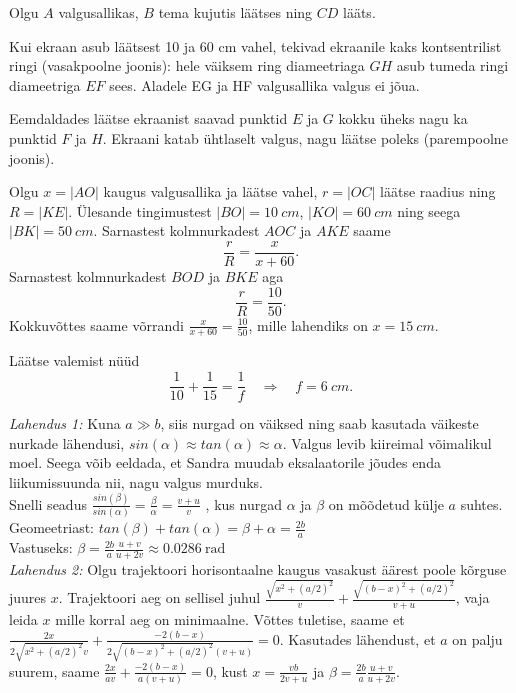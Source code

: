\documentclass[10pt]{article}
\begin{document}
Olgu $A$ valgusallikas, $B$ tema kujutis läätses ning $CD$ lääts.

Kui ekraan asub läätsest 10 ja 60 cm vahel, tekivad ekraanile kaks kontsentrilist ringi (vasakpoolne joonis): hele väiksem ring diameetriaga $GH$ asub tumeda ringi diameetriga $EF$ sees. Aladele EG ja HF valgusallika valgus ei jõua.

Eemdaldades läätse ekraanist saavad punktid $E$ ja $G$ kokku üheks nagu ka punktid $F$ ja $H$. Ekraani katab ühtlaselt valgus, nagu läätse poleks (parempoolne joonis).

Olgu $x=|AO|$ kaugus valgusallika ja läätse vahel, $r=|OC|$ läätse raadius ning $R=|KE|$. Ülesande tingimustest $|BO|=\SI{10}{cm}$, $|KO|=\SI{60}{cm}$ ning seega $|BK|=\SI{50}{cm}$. Sarnastest kolmnurkadest $AOC$ ja $AKE$ saame
\[
  \frac{r}{R}=\frac{x}{x+60}.
\]
Sarnastest kolmnurkadest $BOD$ ja $BKE$ aga
\[
  \frac{r}{R}=\frac{10}{50}.
\]
Kokkuvõttes saame võrrandi $\displaystyle{\frac{x}{x+60}=\frac{10}{50}}$, mille lahendiks on $x=\SI{15}{cm}$.

Läätse valemist nüüd
\[
  \frac{1}{10}+\frac{1}{15}=\frac{1}{f}\quad \Rightarrow \quad f=\SI{6}{cm}.
\]
\probend
\bigskip


\solu
\emph{Lahendus 1:} Kuna $a \gg b$, siis nurgad on väiksed ning saab kasutada väikeste nurkade lähendusi, $ sin(\alpha) \approx tan( \alpha) \approx \alpha $. Valgus levib kiireimal võimalikul moel. Seega võib eeldada, et Sandra muudab eksalaatorile jõudes enda liikumissuunda nii, nagu valgus murduks.\\
Snelli seadus $ \frac{sin(\beta)}{sin(\alpha)} = \frac{\beta}{\alpha} = \frac{v+u}{v} $ , kus nurgad $\alpha$ ja $\beta$ on mõõdetud külje $a$  suhtes.\\
Geomeetriast: $ tan(\beta) + tan(\alpha) = \beta + \alpha =\frac{2b}{a}$\\
Vastuseks: $ \beta = \frac{2b}{a} \frac{u+v}{u+2v} \approx \SI{0,0286}{\radian}$\\


\emph{Lahendus 2:} Olgu trajektoori horisontaalne kaugus vasakust äärest poole kõrguse juures $x$. Trajektoori aeg on sellisel juhul $\frac{\sqrt{x^2+(a/2)^2}}{v} + \frac{\sqrt{(b-x)^2+(a/2)^2}}{v+u}$, vaja leida $x$ mille korral aeg on minimaalne. Võttes tuletise, saame et $\frac{2x}{2\sqrt{x^2+(a/2)^2}v} + \frac{-2(b-x)}{2\sqrt{(b-x)^2+(a/2)^2}(v+u)} = 0$. Kasutades lähendust, et $a$ on palju suurem, saame $\frac{2x}{av} + \frac{-2(b-x)}{a(v+u)} = 0$, kust $x = \frac{vb}{2v+u}$ ja $\beta = \frac{2b}{a} \frac{u+v}{u+2v}$.
\probend
\bigskip
\end{document}
